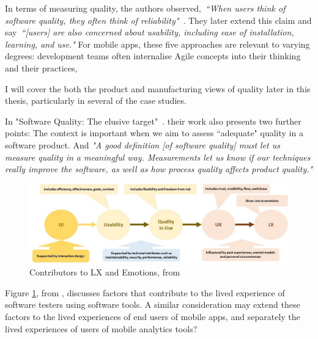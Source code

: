 In terms of measuring quality, the authors observed,~\emph{``When users think of software quality, they often think of reliability"}~\citep{kitchenham1996_software_quality_elusive_target}. They later extend this claim and say~\emph{``[users] are also concerned about usability, including ease of installation, learning, and use."}
%
For mobile apps, these five approaches are relevant to varying degrees: development teams often internalise Agile concepts into their thinking and their practices, %

I will cover the both the product and manufacturing views of quality later in this thesis, particularly in several of the case studies.



In "Software Quality: The elusive target"~\cite{kitchenham1996_software_quality_elusive_target}. their work also presents two further points: The context is important when we aim to assess ``adequate" quality in a software product. And \emph{"A good definition [of software quality] must let us measure quality in a meaningful way. Measurements let us know if our techniques really improve the software, as well as how process quality affects product quality."}

\begin{figure}
    \centering
    \includegraphics[width=15cm]{images/isabel-evans/Contributors_to_LX_v3.jpeg}
    \caption{Contributors to LX and Emotions, from~\citealp{evans2021_scared_frustrated_and_quietly_proud}}
    \label{fig:contributors-to-lx-and-emotions-v3}
\end{figure}

Figure \ref{fig:contributors-to-lx-and-emotions-v3}, from \citealp{evans2021_scared_frustrated_and_quietly_proud}, discusses factors that contribute to the lived experience of software testers using software tools. A similar consideration may extend these factors to the lived experiences of end users of mobile apps, and separately the lived experiences of users of mobile analytics tools?

